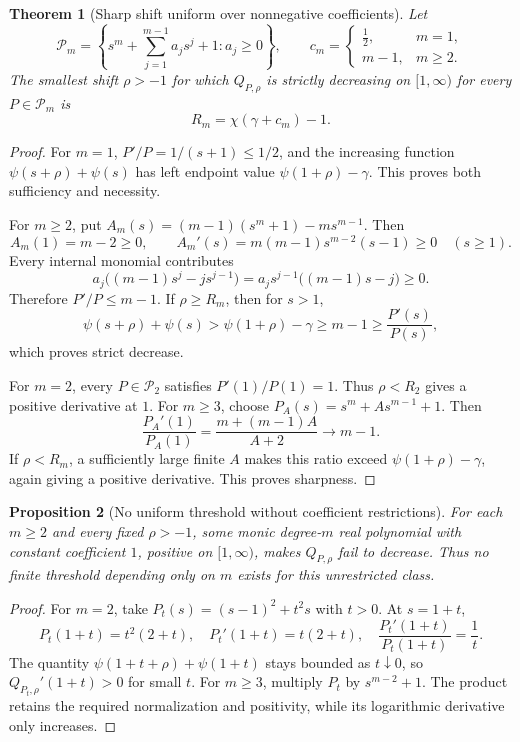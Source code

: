 \documentclass[11pt,a4paper]{article}
\newtheorem{theorem}{Theorem}[section]
\newtheorem{proposition}[theorem]{Proposition}
\theoremstyle{definition}
\theoremstyle{remark}
\numberwithin{equation}{section}
\begin{document}
\begin{theorem}[Sharp shift uniform over nonnegative coefficients]
\label{p1:thm:uniform-poly-threshold}
Let
\[
 \mathcal P_m=\left\{s^m+\sum_{j=1}^{m-1}a_js^j+1:a_j\ge0\right\},
 \qquad
 c_m=\begin{cases}\tfrac12,&m=1,\\m-1,&m\ge2.\end{cases}
\]
The smallest shift $\rho>-1$ for which $Q_{P,\rho}$ is strictly decreasing on $[1,\infty)$ for every $P\in\mathcal P_m$ is
\[
 R_m=\chi(\gamma+c_m)-1.
\]
\end{theorem}
\begin{proof}
For $m=1$, $P'/P=1/(s+1)\le1/2$, and the increasing function $\psi(s+\rho)+\psi(s)$ has left endpoint value $\psi(1+\rho)-\gamma$. This proves both sufficiency and necessity.

For $m\ge2$, put $A_m(s)=(m-1)(s^m+1)-ms^{m-1}$. Then
\[
 A_m(1)=m-2\ge0,\qquad
 A_m'(s)=m(m-1)s^{m-2}(s-1)\ge0\quad(s\ge1).
\]
Every internal monomial contributes
\[
 a_j\big((m-1)s^j-js^{j-1}\big)
 =a_js^{j-1}\big((m-1)s-j\big)\ge0.
\]
Therefore $P'/P\le m-1$. If $\rho\ge R_m$, then for $s>1$,
\[
 \psi(s+\rho)+\psi(s)>\psi(1+\rho)-\gamma
 \ge m-1\ge\frac{P'(s)}{P(s)},
\]
which proves strict decrease.

For $m=2$, every $P\in\mathcal P_2$ satisfies $P'(1)/P(1)=1$. Thus $\rho<R_2$ gives a positive derivative at $1$. For $m\ge3$, choose
$P_A(s)=s^m+As^{m-1}+1$. Then
\[
 \frac{P_A'(1)}{P_A(1)}=
 \frac{m+(m-1)A}{A+2}\longrightarrow m-1.
\]
If $\rho<R_m$, a sufficiently large finite $A$ makes this ratio exceed $\psi(1+\rho)-\gamma$, again giving a positive derivative. This proves sharpness.
\end{proof}

\begin{proposition}[No uniform threshold without coefficient restrictions]
\label{p1:prop:negative-coeff-obstruction}
For each $m\ge2$ and every fixed $\rho>-1$, some monic degree-$m$ real polynomial with constant coefficient $1$, positive on $[1,\infty)$, makes $Q_{P,\rho}$ fail to decrease. Thus no finite threshold depending only on $m$ exists for this unrestricted class.
\end{proposition}
\begin{proof}
For $m=2$, take $P_t(s)=(s-1)^2+t^2s$ with $t>0$. At $s=1+t$,
\[
 P_t(1+t)=t^2(2+t),\quad P_t'(1+t)=t(2+t),\quad
 \frac{P_t'(1+t)}{P_t(1+t)}=\frac1t.
\]
The quantity $\psi(1+t+\rho)+\psi(1+t)$ stays bounded as $t\downarrow0$, so $Q_{P_t,\rho}'(1+t)>0$ for small $t$. For $m\ge3$, multiply $P_t$ by $s^{m-2}+1$. The product retains the required normalization and positivity, while its logarithmic derivative only increases.
\end{proof}
\end{document}
